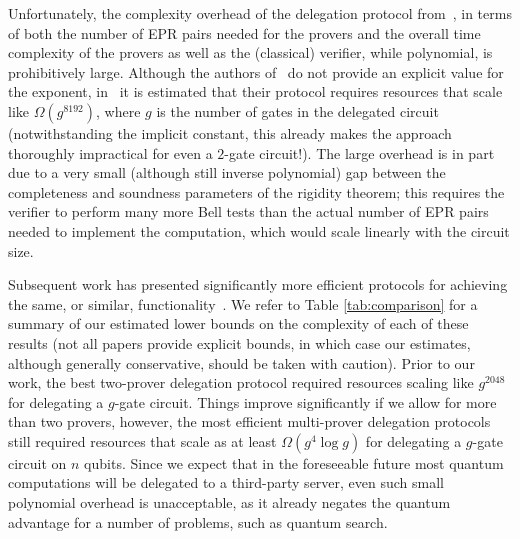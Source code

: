 \documentclass[11pt]{article}
\begin{document}
Unfortunately, the complexity overhead of the delegation protocol from~\cite{reichardt2012classical}, in terms of both the number of EPR pairs needed for the provers and the overall time complexity of the provers as well as the (classical) verifier, while polynomial, is prohibitively large. Although the authors of~\cite{reichardt2012classical} do not provide an explicit value for the exponent, in~\cite{hajdusek2015} it is estimated that their protocol requires resources that scale like $\Omega(g^{8192})$, where $g$ is the number of gates in the delegated circuit (notwithstanding the implicit constant, this already makes the approach thoroughly impractical for even a $2$-gate circuit!).
The large overhead is in part due to a very small (although still inverse polynomial) gap between the completeness and soundness parameters of the rigidity theorem; this requires the verifier to perform many more Bell tests than the actual number of EPR pairs needed to implement the computation, which would scale linearly with the circuit size. 

Subsequent work has presented significantly more efficient protocols for achieving the same, or similar,  functionality~\cite{McKague16,Gheorghiu15,hajdusek2015}. We refer to Table \ref{tab:comparison}
for a summary of our estimated lower bounds on the complexity of each of these
results (not all papers provide explicit bounds, in which case our estimates,
although generally conservative, should be taken with caution). Prior to our
work, the best two-prover delegation protocol required resources scaling like
$g^{2048}$ for delegating a $g$-gate circuit. Things improve significantly if we
allow for more than two provers, however, the most efficient multi-prover
delegation protocols still required resources that scale
as at least $\Omega(g^4\log{g})$ for delegating a $g$-gate circuit on $n$ qubits.
Since we expect that in the foreseeable future most quantum computations will be delegated to a third-party server, even such small polynomial overhead is unacceptable, as it already negates the quantum advantage for a number of problems, such as quantum search.
\end{document}
